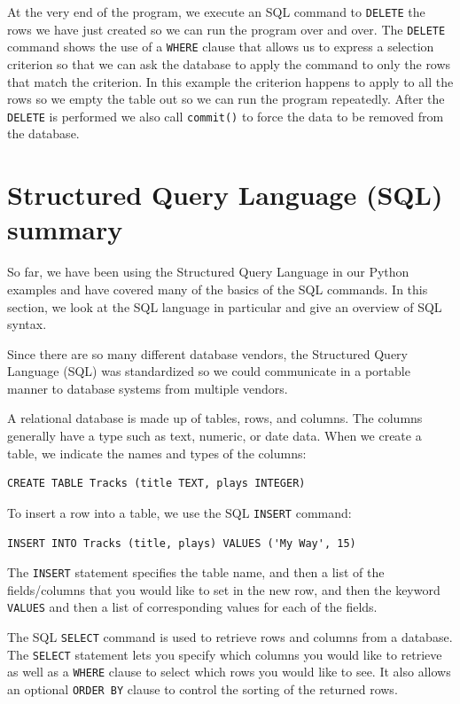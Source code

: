 \documentclass[10pt]{book}
\begin{document}
At the very end of the program, we execute an SQL command to {\tt DELETE} 
the rows we have just created so we can run the program over and over.
The {\tt DELETE} command shows the use of a {\tt WHERE} clause that
allows us to express a selection criterion so that we can ask the database
to apply the command to only the rows that match the criterion.  In this example
the criterion happens to apply to all the rows so we empty the table
out so we can run the program repeatedly.  After the {\tt DELETE} is performed
we also call {\tt commit()} to force the data to be removed from the database.

\section{Structured Query Language (SQL) summary}

So far, we have been using the Structured Query Language in our Python
examples and have covered many of the basics of the SQL commands.
In this section, we look at the SQL language in particular
and give an overview of SQL syntax.

Since there are so many different database vendors, the Structured Query
Language (SQL) was standardized so we could communicate in a portable
manner to database systems from multiple vendors.

A relational database is made up of tables, rows, and columns.  The columns
generally have a type such as text, numeric, or date data.  When we create
a table, we indicate the names and types of the columns:

\beforeverb
\begin{verbatim}
CREATE TABLE Tracks (title TEXT, plays INTEGER)
\end{verbatim}
\afterverb
%
To insert a row into a table, we use the SQL {\tt INSERT} command:

\beforeverb
\begin{verbatim}
INSERT INTO Tracks (title, plays) VALUES ('My Way', 15)
\end{verbatim}
\afterverb
%
The {\tt INSERT} statement specifies the table name, and then a list of
the fields/columns that you would like to set in the new row, and then 
the keyword {\tt VALUES} and then a list of corresponding values 
for each of the fields.

The SQL {\tt SELECT} command is used to retrieve rows and columns from a database.
The {\tt SELECT} statement lets you specify which columns you would
like to retrieve as well as a {\tt WHERE} clause to select which 
rows you would like to see.  It also allows an optional 
{\tt ORDER BY} clause to control the sorting of the returned rows.
\end{document}
